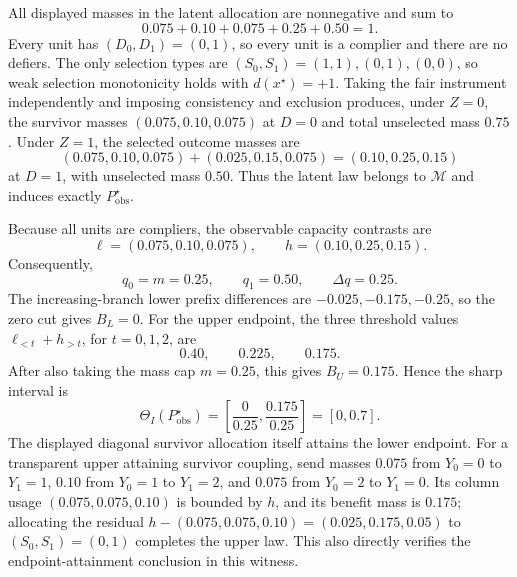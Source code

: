 All displayed masses in the latent allocation are nonnegative and sum to
\[
0.075+0.10+0.075+0.25+0.50=1.
\]
Every unit has \((D_0,D_1)=(0,1)\), so every unit is a complier and there are no defiers.  The only selection types are \((S_0,S_1)=(1,1),(0,1),(0,0)\), so weak selection monotonicity holds with \(d(x^\star)=+1\).  Taking the fair instrument independently and imposing consistency and exclusion produces, under \(Z=0\), the survivor masses \((0.075,0.10,0.075)\) at \(D=0\) and total unselected mass \(0.75\).  Under \(Z=1\), the selected outcome masses are
\[
(0.075,0.10,0.075)+(0.025,0.15,0.075)=(0.10,0.25,0.15)
\]
at \(D=1\), with unselected mass \(0.50\).  Thus the latent law belongs to \(\mathcal M\) and induces exactly \(P_{\mathrm{obs}}^\star\).

Because all units are compliers, the observable capacity contrasts are
\[
\ell=(0.075,0.10,0.075),\qquad h=(0.10,0.25,0.15).
\]
Consequently,
\[
q_0=m=0.25,\qquad q_1=0.50,\qquad \Delta q=0.25.
\]
The increasing-branch lower prefix differences are \(-0.025,-0.175,-0.25\), so the zero cut gives \(B_L=0\).  For the upper endpoint, the three threshold values \(\ell_{<t}+h_{>t}\), for \(t=0,1,2\), are
\[
0.40,\qquad 0.225,\qquad 0.175.
\]
After also taking the mass cap \(m=0.25\), this gives \(B_U=0.175\).  Hence the sharp interval is
\[
\Theta_I(P_{\mathrm{obs}}^\star)
=\left[\frac0{0.25},\frac{0.175}{0.25}\right]=[0,0.7].
\]
The displayed diagonal survivor allocation itself attains the lower endpoint.  For a transparent upper attaining survivor coupling, send masses \(0.075\) from \(Y_0=0\) to \(Y_1=1\), \(0.10\) from \(Y_0=1\) to \(Y_1=2\), and \(0.075\) from \(Y_0=2\) to \(Y_1=0\).  Its column usage \((0.075,0.075,0.10)\) is bounded by \(h\), and its benefit mass is \(0.175\); allocating the residual \(h-(0.075,0.075,0.10)=(0.025,0.175,0.05)\) to \((S_0,S_1)=(0,1)\) completes the upper law.  This also directly verifies the endpoint-attainment conclusion in this witness.